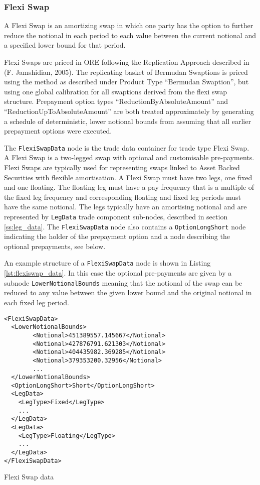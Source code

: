 \subsubsection{Flexi Swap}

A Flexi Swap is an amortizing swap in which one party has the option to further 
reduce the notional in each period to each value between the current notional and 
a specified lower bound for that period.

Flexi Swaps are priced in ORE following the Replication Approach described in (F. Jamshidian, 2005). The replicating basket of
Bermudan Swaptions is priced using the method as described under Product Type ``Bermudan Swaption'', but using one
global calibration for all swaptions derived from the flexi swap structure.
Prepayment option types ``ReductionByAbsoluteAmount'' and ``ReductionUpToAbsoluteAmount'' are both treated approximately
by generating a schedule of deterministic, lower notional bounds from assuming that all earlier prepayment options
were executed.

The \lstinline!FlexiSwapData! node is the trade data container for trade type Flexi Swap. A Flexi Swap is a two-legged
swap with optional and customisable pre-payments. Flexi Swaps are typically used for representing swaps linked to Asset
Backed Securities with flexible amortisation. A Flexi Swap must have two legs, one fixed and one floating. The floating
leg must have a pay frequency that is a multiple of the fixed leg frequency and corresponding floating and fixed leg
periods must have the same notional. The legs typically have an amortising notional and are represented by
\lstinline!LegData! trade component sub-nodes, described in section \ref{ss:leg_data}. The \lstinline!FlexiSwapData!
node also contains a \lstinline!OptionLongShort! node indicating the holder of the prepayment option and a node
describing the optional prepayments, see below.

An example structure of a \lstinline!FlexiSwapData! node is shown in Listing \ref{lst:flexiswap_data}. In this case the
optional pre-payments are given by a subnode \lstinline!LowerNotionalBounds!  meaning that the notional of the swap can
be reduced to any value between the given lower bound and the original notional in each fixed leg period.

\begin{listing}[H]
\begin{verbatim}
<FlexiSwapData>
  <LowerNotionalBounds>
        <Notional>451389557.145667</Notional>
        <Notional>427876791.621303</Notional>
        <Notional>404435982.369285</Notional>
        <Notional>379353200.32956</Notional>
        ...
  </LowerNotionalBounds>
  <OptionLongShort>Short</OptionLongShort>
  <LegData>
    <LegType>Fixed</LegType>
    ...
  </LegData>
  <LegData>
    <LegType>Floating</LegType>
    ...
  </LegData>
</FlexiSwapData>
\end{verbatim}
\caption{Flexi Swap data}
\label{lst:flexiswap_data}
\end{listing}

